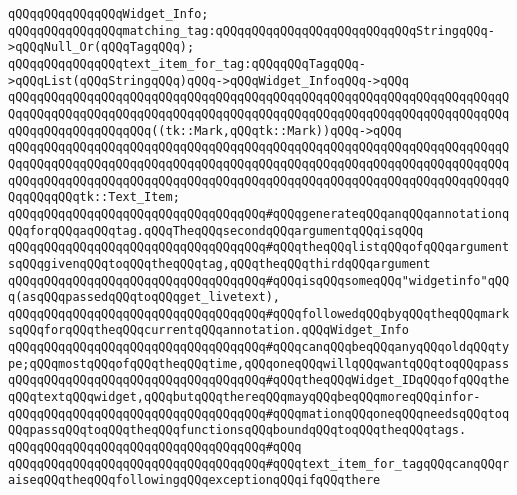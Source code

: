 \verb|qQQqqQQqqQQqqQQqWidget_Info;|\newline
\newline
\verb|qQQqqQQqqQQqqQQqmatching_tag:qQQqqQQqqQQqqQQqqQQqqQQqqQQqStringqQQq->qQQqNull_Or(qQQqTagqQQq);|\newline
\newline
\verb|qQQqqQQqqQQqqQQqtext_item_for_tag:qQQqqQQqTagqQQq->qQQqList(qQQqStringqQQq)qQQq->qQQqWidget_InfoqQQq->qQQq|\newline
\verb|qQQqqQQqqQQqqQQqqQQqqQQqqQQqqQQqqQQqqQQqqQQqqQQqqQQqqQQqqQQqqQQqqQQqqQQqqQQqqQQqqQQqqQQqqQQqqQQqqQQqqQQqqQQqqQQqqQQqqQQqqQQqqQQqqQQqqQQqqQQqqQQqqQQqqQQqqQQqqQQq((tk::Mark,qQQqtk::Mark))qQQq->qQQq|\newline
\verb|qQQqqQQqqQQqqQQqqQQqqQQqqQQqqQQqqQQqqQQqqQQqqQQqqQQqqQQqqQQqqQQqqQQqqQQqqQQqqQQqqQQqqQQqqQQqqQQqqQQqqQQqqQQqqQQqqQQqqQQqqQQqqQQqqQQqqQQqqQQqqQQqqQQqqQQqqQQqqQQqqQQqqQQqqQQqqQQqqQQqqQQqqQQqqQQqqQQqqQQqqQQqqQQqqQQqqQQqqQQqtk::Text_Item;|\newline
\verb|qQQqqQQqqQQqqQQqqQQqqQQqqQQqqQQqqQQq#qQQqgenerateqQQqanqQQqannotationqQQqforqQQqaqQQqtag.qQQqTheqQQqsecondqQQqargumentqQQqisqQQq|\newline
\verb|qQQqqQQqqQQqqQQqqQQqqQQqqQQqqQQqqQQq#qQQqtheqQQqlistqQQqofqQQqargumentsqQQqgivenqQQqtoqQQqtheqQQqtag,qQQqtheqQQqthirdqQQqargument|\newline
\verb|qQQqqQQqqQQqqQQqqQQqqQQqqQQqqQQqqQQq#qQQqisqQQqsomeqQQq"widgetinfo"qQQq(asqQQqpassedqQQqtoqQQqget_livetext),|\newline
\verb|qQQqqQQqqQQqqQQqqQQqqQQqqQQqqQQqqQQq#qQQqfollowedqQQqbyqQQqtheqQQqmarksqQQqforqQQqtheqQQqcurrentqQQqannotation.qQQqWidget_Info|\newline
\verb|qQQqqQQqqQQqqQQqqQQqqQQqqQQqqQQqqQQq#qQQqcanqQQqbeqQQqanyqQQqoldqQQqtype;qQQqmostqQQqofqQQqtheqQQqtime,qQQqoneqQQqwillqQQqwantqQQqtoqQQqpass|\newline
\verb|qQQqqQQqqQQqqQQqqQQqqQQqqQQqqQQqqQQq#qQQqtheqQQqWidget_IDqQQqofqQQqtheqQQqtextqQQqwidget,qQQqbutqQQqthereqQQqmayqQQqbeqQQqmoreqQQqinfor-|\newline
\verb|qQQqqQQqqQQqqQQqqQQqqQQqqQQqqQQqqQQq#qQQqmationqQQqoneqQQqneedsqQQqtoqQQqpassqQQqtoqQQqtheqQQqfunctionsqQQqboundqQQqtoqQQqtheqQQqtags.|\newline
\verb|qQQqqQQqqQQqqQQqqQQqqQQqqQQqqQQqqQQq#qQQq|\newline
\verb|qQQqqQQqqQQqqQQqqQQqqQQqqQQqqQQqqQQq#qQQqtext_item_for_tagqQQqcanqQQqraiseqQQqtheqQQqfollowingqQQqexceptionqQQqifqQQqthere|\newline
